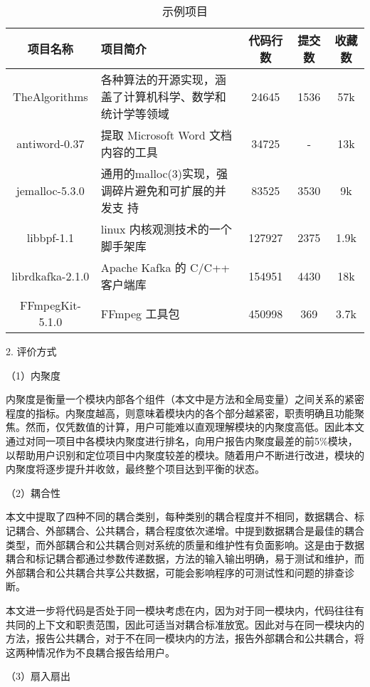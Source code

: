 \begin{table}[htbp]
\caption{示例项目}
\vspace{0.5em}\centering\wuhao
\begin{tabular}{cp{6cm}ccc}
\toprule
项目名称 & 项目简介 & 代码行数& 提交数 & 收藏数 \\
\midrule
TheAlgorithms & 各种算法的开源实现，涵盖了计算机科学、数学和统计学等领域 & 24645 & 1536 & 57k \\
antiword-0.37 & 提取 Microsoft Word 文档内容的工具 & 34725& - & 13k\\
jemalloc-5.3.0 & 通用的malloc(3)实现，强调碎片避免和可扩展的并发支
持  &83525& 3530 & 9k \\
libbpf-1.1 & linux 内核观测技术的一个脚手架库 & 127927 & 2375 & 1.9k \\
librdkafka-2.1.0& Apache Kafka 的 C/C++ 客户端库 & 154951 & 4430 & 18k \\
FFmpegKit-5.1.0 & FFmpeg 工具包 & 450998 & 369 & 3.7k \\

\bottomrule
\end{tabular}
\end{table}

2. 评价方式

（1）内聚度

内聚度是衡量一个模块内部各个组件（本文中是方法和全局变量）之间关系的紧密程度的指标。内聚度越高，则意味着模块内的各个部分越紧密，职责明确且功能聚焦。然而，仅凭数值的计算，用户可能难以直观理解模块的内聚度高低。因此本文通过对同一项目中各模块内聚度进行排名，向用户报告内聚度最差的前5\%模块，以帮助用户识别和定位项目中内聚度较差的模块。随着用户不断进行改进，模块的内聚度将逐步提升并收敛，最终整个项目达到平衡的状态。

（2）耦合性

本文中提取了四种不同的耦合类别，每种类别的耦合程度并不相同，数据耦合、标记耦合、外部耦合、公共耦合，耦合程度依次递增。中提到数据耦合是最佳的耦合类型，而外部耦合和公共耦合则对系统的质量和维护性有负面影响。这是由于数据耦合和标记耦合都通过参数传递数据，方法的输入输出明确，易于测试和维护，而外部耦合和公共耦合共享公共数据，可能会影响程序的可测试性和问题的排查诊断。

本文进一步将代码是否处于同一模块考虑在内，因为对于同一模块内，代码往往有共同的上下文和职责范围，因此可适当对耦合标准放宽。因此对与在同一模块内的方法，报告公共耦合，对于不在同一模块内的方法，报告外部耦合和公共耦合，将这两种情况作为不良耦合报告给用户。

（3）扇入扇出

